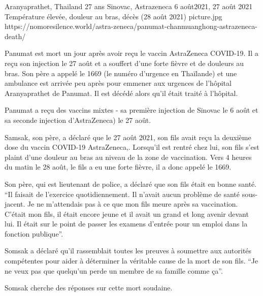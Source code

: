 {Aranyaprathet, Thailand}
{27 ans}
{Sinovac, Astrazeneca}
{6 août2021, 27 août 2021}
{Température élevée, douleur au bras, décès (28 août 2021)}
{picture.jpg}
{https://nomoresilence.world/astra-zeneca/panumat-chanmuanghong-astrazeneca-death/}
{

Panumat est mort un jour après avoir reçu le vaccin AstraZeneca COVID-19. Il a
reçu son injection le 27 août et a souffert d'une forte fièvre et de douleurs au
bras. Son père a appelé le 1669 (le numéro d'urgence en Thaïlande) et une
ambulance est arrivée peu après pour emmener aux urgences de l'hôpital
Aranyaprathet de Panumat. Il est décédé alors qu'il était traité à l'hôpital.

Panumat a reçu des vaccins mixtes - sa première injection de Sinovac le 6 août
et sa seconde injection d'AstraZeneca) le 27 août.

Samsak, son père, a déclaré que le 27 août 2021, son fils avait reçu la deuxième
dose du vaccin COVID-19 AstraZeneca,. Lorsqu'il est rentré chez lui, son fils
s'est plaint d'une douleur au bras au niveau de la zone de vaccination. Vers 4
heures du matin le 28 août, le fils a eu une forte fièvre, il a donc appelé le
1669.

Son père, qui est lieutenant de police, a déclaré que son fils était en bonne
santé. “Il faisait de l'exercice quotidiennement. Il n'avait aucun problème de
santé sous-jacent. Je ne m'attendais pas à ce que mon fils meure après sa
vaccination. C'était mon fils, il était encore jeune et il avait un grand et
long avenir devant lui. Il était sur le point de passer les examens d'entrée
pour un emploi dans la fonction publique”.

Somsak a déclaré qu'il rassemblait toutes les preuves à soumettre aux autorités
compétentes pour aider à déterminer la véritable cause de la mort de son
fils. “Je ne veux pas que quelqu'un perde un membre de sa famille comme ça”.

Somsak cherche des réponses sur cette mort soudaine.

}

